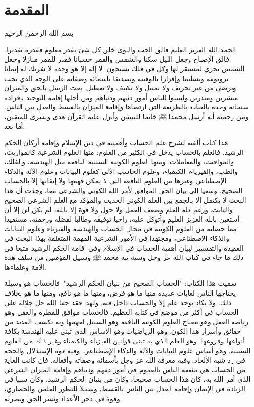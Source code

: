 \chapter*{المقدمة}

\begin{center}
    بسم الله الرحمن الرحيم
\end{center}

الحمد الله العزيز العليم فالق الحب والنوى خلق كل شئ بقدر معلوم فقدره تقديرا. فالق الإصباح وجعل الليل سكنا والشمس والقمر حسبانا فقدر للقمر منازلا وجعل الشمس تجري لمستقر لها وكل في فلك يسبحون. لا إله إلا هو وحده لا شريك له  إيمانا بروبويته وتسليما وإقرارا بألوهيته وتصديقا بأسمائه وصفاته على الوجه الذي يحب ويرضى من غير تحريف ولا تمثيل ولا تكييف ولا تعطيل. بعث الرسل بالحق والميزان مبشرين ومنذرين وليبينوا للناس أمور دنيهم ودنياهم ومن أجلها إقامة التوحيد بإفراده سبحانه وحده بالعبادة بالطريقة التي ارتضاها وإقامة الميزان بالقسط والعدل بين الناس. ومن رحمته أنه أرسل محمدا ﷺ خاتما للنبيئين وأنزل عليه القرآن هدى وبشرى للمتقين، أما بعد:

هذا كتاب ألفته لشرح علم الحساب وأهميته في دين الإسلام وإقامة أركان الحكم الرشيد. فالعلم بالحساب يدخل في الكثير من العلوم: منها العلوم الشرعية كالمواريث، والمواقيت، والمعاملات، ومنها العلوم الكونية السببية النافعة مثل الهندسة، والفلك، والطب، والفيزياء، الكيمياء، وعلوم الحاسب الآلي كعلوم البيانات وعلوم الآلة والذكاء الإصطناعي وغيرها من العلوم النافعة التي لا يمكن فهمها ولا إتقانها إلا بالحساب الصحيح. وسعيا إلى بيان الحق الموافق لأمر الله الكوني والشرعي معا، وجدت أن هذا البحث لا يكتمل إلا بالجمع بين العلم الكوني الحديث والمؤكد مع العلم الشرعي الصحيح والثابت. ورغم قلة العلم وضعف العمل ولا حول ولا قوة إلا بالله، لم يكن لي إلا أن أستعين بالله العزيز العليم وأتوكل عليه، راجيا توفيقه وطالبا لفضله ورحمته، مستفيدا مما حصلته من العلوم الكونية في مجال الحساب والهندسة والفيزياء وعلوم البيانات والذكاء الإصطناعي، ومجتهدا في الأمور الشرعية المهمة المتعلقة بهذا البحث في العقيدة والتفسيير لبيان أهمية الحساب في الإسلام وفي إقامة الحكم الرشيد متبعا في ذلك ما جاء في كتاب الله عز وجل وسنة نبه محمد ﷺ وسبيل المؤمنين من سلف هذه الأمة وعلماءها.

سميت هذا الكتاب: "الحساب الصحيح من بنيان الحكم الرشيد". فالحساب هو وسيلة يحتاجها الناس لغايات عديدة منها ما هو فرض، ومنها ما هو نافع، ومنها ما هو بخلاف ذلك. ولا يكاد يوجد علم إلا والحساب داخل فيه. ولهذا فقد حثنا الله جل جلاله على الحساب في أكثر من موضع في كتابه العظيم. فالحساب موافق للفطرة والعقل وهو رياضة العقل وهو مفتاح العلوم الكونية النافعة وهو السبيل لفهمها وبه تكشف العديد من حقائق وأسرار هذا الكون. وهو الرياضيات وهو الأساس الذي تبنى عليه الهندسة بكافة أنواعها وفروعها. وهو العلم الذي به تبنى قوانين الفيزياء والكيمياء وغير ذلك من العلوم السببية. وهو أساس علوم البيانات والآلة والذكاء الإصطناعي. وفيه قوه الإستدلال والحجة في رد شبه الإلحاد. وفيه معرفة الله عز وجل بأسمائه وصفاته وأفعاله. فإن كانت الغاية من الحساب هي منفعة الناس بالعموم في أمور دينهم ودنياهم وإقامة الميزان الشرعي الذي أمر الله به، كان هذا الحساب صحيحا، وكان من بنيان الحكم الرشيد، وكان سببا في الزيادة في الإيمان وإقامة العدل بين الناس بالقسط، وسبيلا للتطور العلمي والحضاري، وقوة في دحر الأعداء ونشر الحق ونصرته. 

